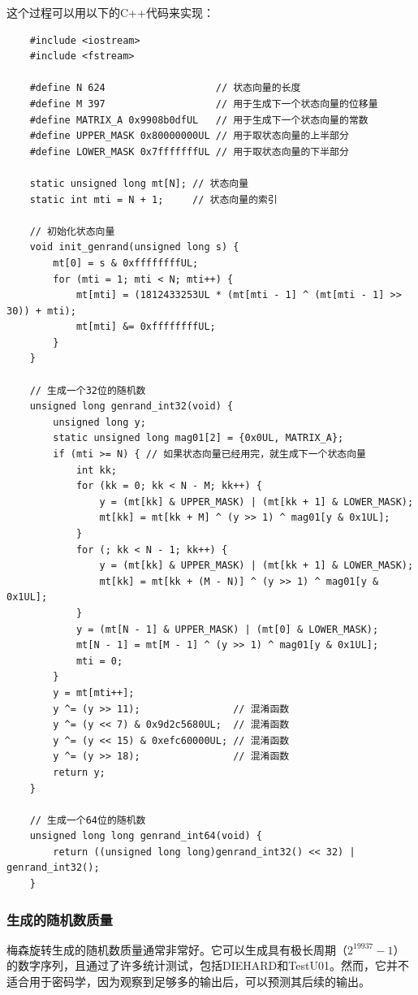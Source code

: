 \documentclass{ctexart}
\begin{document}
    这个过程可以用以下的C++代码来实现：

    \begin{lstlisting}
    #include <iostream>
    #include <fstream>

    #define N 624                   // 状态向量的长度
    #define M 397                   // 用于生成下一个状态向量的位移量
    #define MATRIX_A 0x9908b0dfUL   // 用于生成下一个状态向量的常数
    #define UPPER_MASK 0x80000000UL // 用于取状态向量的上半部分
    #define LOWER_MASK 0x7fffffffUL // 用于取状态向量的下半部分

    static unsigned long mt[N]; // 状态向量
    static int mti = N + 1;     // 状态向量的索引

    // 初始化状态向量
    void init_genrand(unsigned long s) {
        mt[0] = s & 0xffffffffUL;
        for (mti = 1; mti < N; mti++) {
            mt[mti] = (1812433253UL * (mt[mti - 1] ^ (mt[mti - 1] >> 30)) + mti);
            mt[mti] &= 0xffffffffUL;
        }
    }

    // 生成一个32位的随机数
    unsigned long genrand_int32(void) {
        unsigned long y;
        static unsigned long mag01[2] = {0x0UL, MATRIX_A};
        if (mti >= N) { // 如果状态向量已经用完，就生成下一个状态向量
            int kk;
            for (kk = 0; kk < N - M; kk++) {
                y = (mt[kk] & UPPER_MASK) | (mt[kk + 1] & LOWER_MASK);
                mt[kk] = mt[kk + M] ^ (y >> 1) ^ mag01[y & 0x1UL];
            }
            for (; kk < N - 1; kk++) {
                y = (mt[kk] & UPPER_MASK) | (mt[kk + 1] & LOWER_MASK);
                mt[kk] = mt[kk + (M - N)] ^ (y >> 1) ^ mag01[y & 0x1UL];
            }
            y = (mt[N - 1] & UPPER_MASK) | (mt[0] & LOWER_MASK);
            mt[N - 1] = mt[M - 1] ^ (y >> 1) ^ mag01[y & 0x1UL];
            mti = 0;
        }
        y = mt[mti++];
        y ^= (y >> 11);                // 混淆函数
        y ^= (y << 7) & 0x9d2c5680UL;  // 混淆函数
        y ^= (y << 15) & 0xefc60000UL; // 混淆函数
        y ^= (y >> 18);                // 混淆函数
        return y;
    }

    // 生成一个64位的随机数
    unsigned long long genrand_int64(void) {
        return ((unsigned long long)genrand_int32() << 32) | genrand_int32();
    }
    \end{lstlisting}
        \subsubsection{生成的随机数质量}
        梅森旋转生成的随机数质量通常非常好。它可以生成具有极长周期（$2^{19937}-1$）的数字序列，且通过了许多统计测试，包括DIEHARD和TestU01。然而，它并不适合用于密码学，因为观察到足够多的输出后，可以预测其后续的输出。
\end{document}
